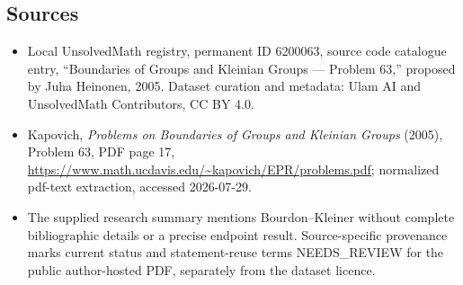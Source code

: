 \documentclass[11pt]{article}
\begin{document}
\subsection{Sources}
\begin{itemize}
\item Local UnsolvedMath registry, permanent ID 6200063, source code catalogue entry, ``Boundaries of Groups and Kleinian Groups --- Problem 63,'' proposed by Juha Heinonen, 2005. Dataset curation and metadata: Ulam AI and UnsolvedMath Contributors, CC BY 4.0.
\item Kapovich, \emph{Problems on Boundaries of Groups and Kleinian Groups} (2005), Problem 63, PDF page 17, \url{https://www.math.ucdavis.edu/~kapovich/EPR/problems.pdf}; normalized pdf-text extraction, accessed 2026-07-29.
\item The supplied research summary mentions Bourdon--Kleiner without complete bibliographic details or a precise endpoint result. Source-specific provenance marks current status and statement-reuse terms NEEDS\_REVIEW for the public author-hosted PDF, separately from the dataset licence.
\end{itemize}
\end{document}
